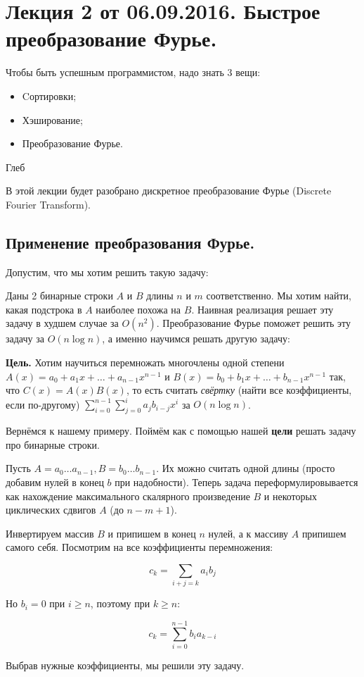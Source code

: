 \documentclass[a4paper, 12pt]{article}
\begin{document}
\pagestyle{fancy}

\section{Лекция 2 от 06.09.2016. Быстрое преобразование Фурье.}
\epigraph{Чтобы быть успешным программистом, надо знать 3 вещи: 
\begin{itemize}
\item Cортировки;
\item Хэширование;
\item Преобразование Фурье.
\end{itemize}
\leavevmode}{Глеб}

В этой лекции будет разобрано дискретное преобразование Фурье (Discrete Fourier
Transform).

\subsection{Применение преобразования Фурье.}

Допустим, что мы хотим решить такую задачу:

\begin{Examples}
  Даны 2 бинарные строки $A$ и $B$ длины $n$ и $m$ соответственно. Мы хотим найти, какая подстрока в $A$ наиболее
  похожа на $B$. Наивная реализация решает эту задачу в худшем случае за
  $O(n^2)$. Преобразование
  Фурье поможет решить эту задачу за $O(n\log n)$, а именно научимся решать другую
  задачу:

{\bf Цель.}
  Хотим научиться перемножать многочлены одной степени \newline $A(x) = a_0 + a_1x + \ldots + a_{n - 1}x^{n - 1}$
  и $B(x) = b_0 + b_1x + \ldots + b_{n - 1}x^{n - 1}$ так, что 
  $C(x) = A(x)B(x)$, то есть считать \textit{свёртку} (найти все коэффициенты, если по-другому) 
  $\sum\limits_{i = 0}^{n - 1} \sum\limits_{j = 0}^i a_jb_{i - j}x^i$ за $O(n\log n)$.

Вернёмся к нашему примеру. Поймём как с помощью нашей {\bf цели} решать задачу
про бинарные строки.

Пусть $A = a_0 \ldots a_{n - 1}, B = b_0\ldots b_{n - 1}$. Их можно считать одной длины
(просто добавим нулей в конец $b$ при надобности). Теперь задача 
переформулировывается как нахождение максимального скалярного произведение
$B$ и некоторых циклических сдвигов $A$ (до $n - m + 1$).

Инвертируем массив $B$ и припишем в конец $n$ нулей, а к массиву
$A$ припишем самого себя. Посмотрим на все коэффициенты перемножения:

\[
  c_k = \sum\limits_{i + j = k} a_ib_j
\]

Но $b_i = 0$ при $i \geqslant n$, поэтому при $k \geqslant n$:

\[
  c_k = \sum\limits_{i = 0}^{n - 1} b_ia_{k - i}
\]

Выбрав нужные коэффициенты, мы решили эту задачу.

\end{Examples}
\end{document}

